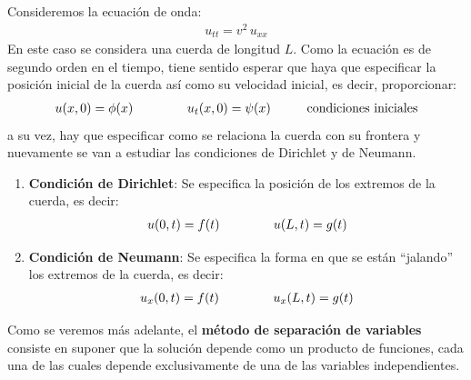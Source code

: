 \documentclass[12pt]{article}
\numberwithin{equation}{section}
\begin{document}
Consideremos la ecuación de onda:
\begin{align*}
u_{tt} = v^{2} \, u_{xx}
\end{align*}
En este caso se considera una cuerda de longitud $L$. Como la ecuación es de segundo orden en el tiempo, tiene sentido esperar que haya que especificar la posición inicial de la cuerda así como su velocidad inicial, es decir, proporcionar:
\begin{align}
u (x, 0) = \phi (x) \hspace{1.5cm} u_{t}(x, 0) = \psi (x) \hspace{1cm} \mbox{condiciones iniciales}
\label{eq:ecuacion_06_02_07}
\end{align}
a su vez, hay que especificar como se relaciona la cuerda con su frontera y nuevamente se van a estudiar las condiciones de Dirichlet y de Neumann.
\begin{enumerate}
\item \textbf{Condición de Dirichlet}: Se especifica la posición de los extremos de la cuerda, es decir:
\begin{align}
u (0, t) = f (t) \hspace{1.5cm} u (L, t) = g(t)
\label{eq:ecuacion_06_02_08}   
\end{align}
\item \textbf{Condición de Neumann}: Se especifica la forma en que se están \enquote{jalando} los extremos de la cuerda, es decir:
\begin{align}
u_{x} (0, t) = f(t) \hspace{1.5cm} u_{x} (L,t) = g(t)
\label{eq:ecuacion_06_02_09}    
\end{align}
\end{enumerate}
Como se veremos más adelante, el \textbf{método de separación de variables} consiste en suponer que la solución depende como un producto de funciones, cada una de las cuales depende exclusivamente de una de las variables independientes.
\end{document}
